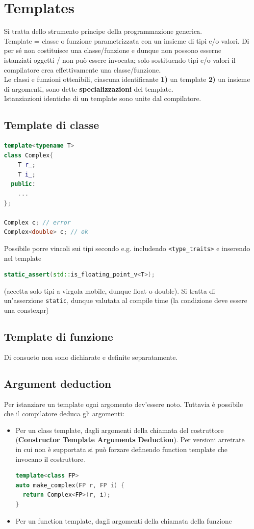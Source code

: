 \documentclass[10pt, oneside]{book}
\begin{document}
\chapter{Templates}
Si tratta dello strumento principe della programmazione generica.\\
Template = classe o funzione parametrizzata con un insieme di tipi e/o valori. Di per sé non costituisce una classe/funzione e dunque non possono esserne istanziati oggetti / non può essere invocata; solo sostituendo tipi e/o valori il compilatore crea effettivamente una classe/funzione.\\
Le classi e funzioni ottenibili, ciascuna identificante \textbf{1)} un template \textbf{2)} un insieme di argomenti, sono dette \textbf{specializzazioni} del template. \\
Istanziazioni identiche di un template sono unite dal compilatore.

\section{Template di classe}
\begin{lstlisting}[language=C++]
template<typename T>
class Complex{
    T r_;
    T i_;
  public:
    ...
};

Complex c; // error
Complex<double> c; // ok
\end{lstlisting}
Possibile porre vincoli sui tipi secondo e.g. includendo \texttt{<type\_traits>} e inserendo nel template
\begin{lstlisting}[language=C++]
static_assert(std::is_floating_point_v<T>);
\end{lstlisting}
(accetta solo tipi a virgola mobile, dunque float o double). Si tratta di un'asserzione \texttt{static}, dunque valutata al compile time (la condizione deve essere una constexpr)

\section{Template di funzione}
Di consueto non sono dichiarate e definite separatamente.

\section{Argument deduction}
Per istanziare un template ogni argomento dev'essere noto. Tuttavia è possibile che il compilatore deduca gli argomenti:
\begin{itemize}
\item Per un class template, dagli argomenti della chiamata del costruttore (\textbf{Constructor Template Arguments Deduction}). Per versioni arretrate in cui non è supportata si può forzare definendo function template che invocano il costruttore.
\begin{lstlisting}[language=C++]
template<class FP>
auto make_complex(FP r, FP i) {
  return Complex<FP>(r, i);
}
\end{lstlisting}
\item Per un function template, dagli argomenti della chiamata della funzione
\end{itemize}
\end{document}
